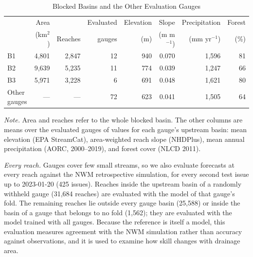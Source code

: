 \begin{table}
\caption{Blocked Basins and the Other Evaluation Gauges}
\label{tab:blocked}
\footnotesize
\setlength{\parindent}{0pt}
\renewcommand{\arraystretch}{1.3}
\setlength{\tabcolsep}{4pt}
\begin{tabular}{@{}lrrrrrrr@{}}
\toprule
 & Area & & Evaluated & Elevation & Slope & Precipitation & Forest \\
 & (km$^2$) & Reaches & gauges & (m) & (m m$^{-1}$) & (mm yr$^{-1}$) & (\%) \\
\midrule
B1 & 4,801 & 2,847 & 12 & 940 & 0.070 & 1,596 & 81 \\
B2 & 9,639 & 5,235 & 11 & 774 & 0.039 & 1,247 & 66 \\
B3 & 5,971 & 3,228 & 6 & 691 & 0.048 & 1,621 & 80 \\
Other gauges & --- & --- & 72 & 623 & 0.041 & 1,505 & 64 \\
\bottomrule
\end{tabular}
\begin{flushleft}
\footnotesize \emph{Note.} Area and reaches refer to the whole blocked basin. The other columns are means over the evaluated gauges of values for each gauge's upstream basin: mean elevation (EPA StreamCat), area-weighted reach slope (NHDPlus), mean annual precipitation (AORC, 2000--2019), and forest cover (NLCD 2011).
\end{flushleft}
\end{table}

\textit{Every reach.} Gauges cover few small streams, so we also evaluate forecasts at every reach against the NWM retrospective simulation, for every second test issue up to 2023-01-20 (425 issues). Reaches inside the upstream basin of a randomly withheld gauge (31,684 reaches) are evaluated with the model of that gauge's fold. The remaining reaches lie outside every gauge basin (25,588) or inside the basin of a gauge that belongs to no fold (1,562); they are evaluated with the model trained with all gauges. Because the reference is itself a model, this evaluation measures agreement with the NWM simulation rather than accuracy against observations, and it is used to examine how skill changes with drainage area.
